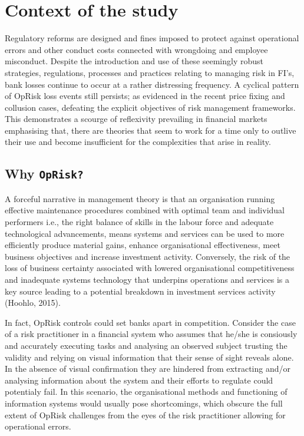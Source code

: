 \documentclass{DissertateUSU}
\begin{document}
\section{Context of the study}
\label{sec:Context of the study}

Regulatory reforms are designed and fines imposed to protect against
operational errors and other conduct costs connected with wrongdoing and
employee misconduct. Despite the introduction and use of these seemingly
robust strategies, regulations, processes and practices relating to
managing risk in FI's, bank losses continue to occur at a rather
distressing frequency. A cyclical pattern of OpRisk loss events still
persists; as evidenced in the recent price fixing and collusion cases,
defeating the explicit objectives of risk management frameworks. This
demonstrates a scourge of reflexivity prevailing in financial markets
emphasising that, there are theories that seem to work for a time only
to outlive their use and become insufficient for the complexities that
arise in reality.

\subsection{Why \texttt{OpRisk?}}

A forceful narrative in management theory is that an organisation
running effective maintenance procedures combined with optimal team and
individual performers i.e., the right balance of skills in the labour
force and adequate technological advancements, means systems and
services can be used to more efficiently produce material gains, enhance
organisational effectiveness, meet business objectives and increase
investment activity. Conversely, the risk of the loss of business
certainty associated with lowered organisational competitiveness and
inadequate systems technology that underpins operations and services is
a key source leading to a potential breakdown in investment services
activity (Hoohlo, 2015).\medskip

In fact, OpRisk controls could set banks apart in competition. Consider
the case of a risk practitioner in a financial system who assumes that
he/she is consiously and accurately executing tasks and analysing an
observed subject trusting the validity and relying on visual information
that their sense of sight reveals alone. In the absence of visual
confirmation they are hindered from extracting and/or analysing
information about the system and their efforts to regulate could
potentialy fail. In this scenario, the organisational methods and
functioning of information systems would usually pose shortcomings,
which obscure the full extent of OpRisk challenges from the eyes of the
risk practitioner allowing for operational errors. \medskip
\end{document}
